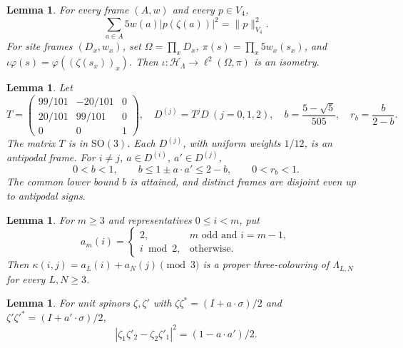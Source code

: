 \documentclass[11pt,reqno]{amsart}
\newtheorem{lemma}[theorem]{Lemma}
\theoremstyle{definition}
\theoremstyle{remark}
\begin{document}
\begin{lemma}\label{l:tight}
For every frame \((A,w)\) and every \(p\in V_4\),
\[
 \sum_{a\in A}5w(a)|p(\zeta(a))|^2=\|p\|_{V_4}^2.
\]
For site frames \((D_x,w_x)\), set \(\Omega=\prod_xD_x\),
\(\pi(s)=\prod_x5w_x(s_x)\), and
\(\iota\varphi(s)=\varphi((\zeta(s_x))_x)\).
Then \(\iota:\mathcal H_\Lambda\to\ell^2(\Omega,\pi)\) is an isometry.
\end{lemma}

\begin{lemma}\label{l:threeframes}
Let
\[
 T=\begin{pmatrix}99/101&-20/101&0\\20/101&99/101&0\\0&0&1\end{pmatrix},
 \quad D^{(j)}=T^jD\ (j=0,1,2),\quad
 b=\frac{5-\sqrt5}{505},\quad r_b=\frac b{2-b}.
\]
The matrix \(T\) is in \(\mathrm{SO}(3)\).
Each \(D^{(j)}\), with uniform weights \(1/12\), is an antipodal frame.
For \(i\ne j\), \(a\in D^{(i)}\), \(a'\in D^{(j)}\),
\[
 0<b<1,\qquad b\le1\pm a\cdot a'\le2-b,\qquad0<r_b<1.
\]
The common lower bound \(b\) is attained, and distinct frames are
disjoint even up to antipodal signs.
\end{lemma}

\begin{lemma}\label{l:colour}
For \(m\ge3\) and representatives \(0\le i<m\), put
\[
 a_m(i)=\begin{cases}2,&m\text{ odd and }i=m-1,\\i\bmod2,&\text{otherwise}.
 \end{cases}
\]
Then \(\kappa(i,j)=a_L(i)+a_N(j)\pmod3\) is a proper
three-colouring of \(\Lambda_{L,N}\) for every \(L,N\ge3\).
\end{lemma}

\begin{lemma}\label{l:qmod}
For unit spinors \(\zeta,\zeta'\) with
\(\zeta\zeta^*=(I+a\cdot\sigma)/2\) and
\(\zeta'\zeta'^*=(I+a'\cdot\sigma)/2\),
\[
 |\zeta_1\zeta'_2-\zeta_2\zeta'_1|^2=(1-a\cdot a')/2 .
\]
\end{lemma}
\end{document}
